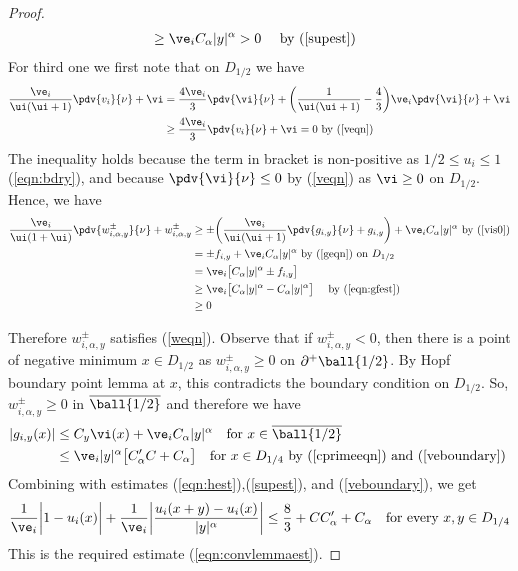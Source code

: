 \begin{proof}
\begin{align*}
    &\geq \ve_i C_\alpha|y|^{\alpha} > 0 \quad \text{ by }(\ref{supest})
\end{align*}
For third  one we first note that on $D_{1/2}$ we have
\begin{align}
    \frac{\ve_i}{\ui(\ui+1)}\pdv{v_i}{\nu} +\vi
    &=\frac{4\ve_i}{3} \pdv{\vi}{\nu} + \bigg(\frac{1}{\ui(\ui+1)} - \frac{4}{3} \bigg)\ve_i \pdv{\vi}{\nu}  +\vi   \\
    &\geq \frac{4\ve_i}{3}  \pdv{v_i}{\nu} +\vi =0 \text{ by (\ref{veqn})} \label{vis0}
\end{align}
The inequality holds because the term in bracket is non-positive as $1/2\leq u_i \leq 1$ (\ref{eqn:bdry}), and because $\pdv{\vi}{\nu}\leq 0$ by (\ref{veqn}) as $\vi \geq0$ on $D_{1/2}.$ Hence, we have
\begin{align*}
    \frac{\ve_i}{\ui(1+\ui)} \pdv{w_{i,\alpha,y}^{\pm}}{\nu} + w_{i,\alpha,y}^{\pm} &\geq \pm \bigg(\frac{\ve_i}{\ui(\ui+1)} \pdv{g_{i,y}}{\nu}+ g_{i,y} \bigg)  + \ve_i C_\alpha|y|^{\alpha} \text{ by (\ref{vis0})}\\
    &=  \pm f_{i,y} + \ve_i C_\alpha|y|^{\alpha} \text{ by (\ref{geqn}) on } D_{1/2} \\ 
    &=\ve_i \big[C_\alpha|y|^{\alpha} \pm f_{i,y} \big] \quad  \\
    &\geq \ve_i \big[C_\alpha|y|^{\alpha}-C_\alpha |y|^\alpha \big] \quad \text{ by (\ref{eqn:gfest})} \\
    &\geq 0    
\end{align*}
    
Therefore $w_{i,\alpha,y}^{\pm}$ satisfies (\ref{weqn}). Observe that if $w_{i,\alpha,y}^{\pm} < 0$, then there is a point of negative minimum $x \in D_{1/2}$ as $w^{\pm}_{i,\alpha,y}\geq 0$ on $\partial^+ \ball {1/2}$. By Hopf boundary point lemma at $x$, this contradicts the boundary condition on $D_{1/2}$. So, $w_{i,\alpha,y}^{\pm} \geq 0$ in $\overline{\ball {1/2}}$ and therefore we have
\begin{align*}
    |g_{i,y}(x)| &\leq C_y \vi(x) + \ve_iC_{\alpha}|y|^{\alpha}  \quad \text{for } x\in \overline{\ball {1/2}} \\
    &\leq \ve_i|y|^{\alpha} \big[ C'_\alpha C + C_\alpha \big] \quad \text{for } x\in D_{1/4} \text{ by (\ref{cprimeeqn}) and (\ref{veboundary}) }
\end{align*}
Combining with estimates  (\ref{eqn:hest}),(\ref{supest}), and (\ref{veboundary}), we get
\begin{equation*}
    \frac{1}{\ve_i}\bigg|1-u_i(x)\bigg| + \frac{1}{\ve_i}\bigg|\frac{u_i(x+y)-u_i(x)}{|y|^\alpha} \bigg| \leq \frac{8}{3} + CC'_\alpha + C_\alpha \quad \text{for every } x,y \in D_{1/4}
\end{equation*}
This is the required estimate (\ref{eqn:convlemmaest}).
\end{proof}


